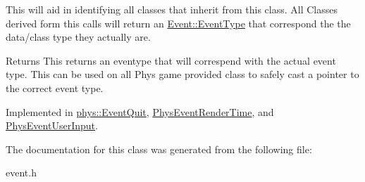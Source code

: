 This will aid in identifying all classes that inherit from this class. All Classes derived form this calls will return an \hyperlink{classphys_1_1Event_af5fdbb3e08d8e578d58770fbc606fda7}{Event::EventType} that correspond the the data/class type they actually are. \begin{DoxyReturn}{Returns}
This returns an eventype that will correspend with the actual event type. This can be used on all Phys game provided class to safely cast a pointer to the correct event type. 
\end{DoxyReturn}


Implemented in \hyperlink{classphys_1_1EventQuit_a4df44098d0ef838db55a8e2a016d0724}{phys::EventQuit}, \hyperlink{classPhysEventRenderTime_a96b0569f8b1cd459383318c9437130d4}{PhysEventRenderTime}, and \hyperlink{classPhysEventUserInput_a2a39643cd222f7af0db7b087e0441582}{PhysEventUserInput}.

The documentation for this class was generated from the following file:\begin{DoxyCompactItemize}
\item 
event.h\end{DoxyCompactItemize}
